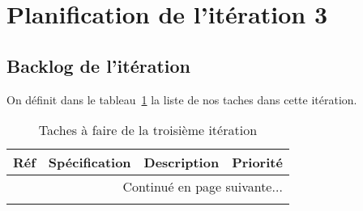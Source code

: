 \section{Planification de l'itération 3}

\subsection{Backlog de l'itération}

On définit dans le tableau~\ref{tab:sprint3-backlog} la liste de nos taches
dans cette itération.

\begin{center}
    \footnotesize
    \begin{longtable}{| p{1cm} | p{5cm} | p{7cm} | p{1cm} |}
        \caption{Taches à faire de la troisième itération}
        \label{tab:sprint3-backlog} \\

 \hline
 \multicolumn{1}{|c}{\textbf{Réf}} &
 \multicolumn{1}{|c}{\textbf{Spécification}} &
 \multicolumn{1}{|c}{\textbf{Description}} &
 \multicolumn{1}{|c|}{\textbf{Priorité}} \\ \hline
 \endhead

 \hline \multicolumn{4}{|r|}{{Continué en page suivante$\dotsc$}} \\ \hline
 \endfoot

 \hline \hline
 \endlastfoot


\end{longtable}
\end{center}
